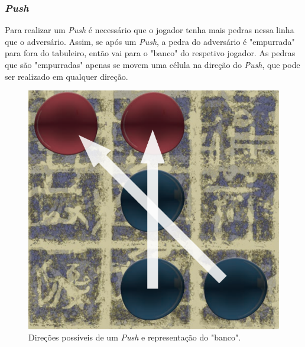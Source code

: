 \documentclass[a4paper]{article}
\begin{document}
\subsubsection{\textit{Push}}

Para realizar um  \textit{Push} é necessário que o jogador tenha mais pedras nessa linha que o adversário. Assim, se após um  \textit{Push}, a pedra do adversário é "empurrada" para fora do tabuleiro, então vai para o "banco" do respetivo jogador. As pedras que são "empurradas" apenas se movem uma célula na direção do \textit{Push}, que pode ser realizado em qualquer direção.

\begin{figure}[!htb]
	\centering
	\includegraphics[scale=0.3]{push.png} 
	\caption{Direções possíveis de um \textit{Push} e representação do "banco".}
\end{figure}
\end{document}
